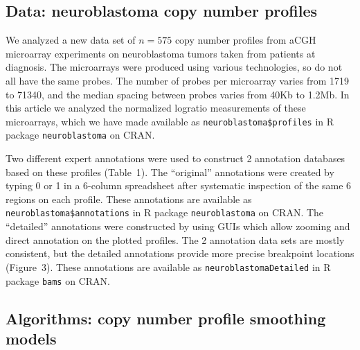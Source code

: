 \documentclass[10pt]{bmc_article}
\newcommand{\code}[1]{\texttt{#1}}
\newcommand{\package}[1]{\texttt{#1}}
\newenvironment{bmcformat}{\begin{raggedright}\baselineskip20pt\sloppy\setboolean{publ}{false}}{\end{raggedright}\baselineskip20pt\sloppy}
\begin{document}
\begin{bmcformat}
\subsection*{Data: neuroblastoma copy number profiles}\label{data}

We analyzed a new data set of $n=575$ copy number profiles from aCGH
microarray experiments on neuroblastoma tumors taken from patients at
diagnosis. The microarrays were produced using various technologies,
so do not all have the same probes. The number of probes per
microarray varies from 1719 to 71340, and the median spacing between
probes varies from 40Kb to 1.2Mb. In this article we analyzed the
normalized logratio measurements of these microarrays, which we have
made available as \code{neuroblastoma\$profiles} in R package
\package{neuroblastoma} on CRAN.

Two different expert annotations were used to construct 2 annotation
databases based on these profiles (Table~1). The ``original''
annotations were created by typing 0 or 1 in a 6-column spreadsheet
after systematic inspection of the same 6 regions on each
profile. These annotations are available as
\code{neuroblastoma\$annotations} in R package \package{neuroblastoma}
on CRAN. The ``detailed'' annotations were constructed by using GUIs
which allow zooming and direct annotation on the plotted profiles. The
2 annotation data sets are mostly consistent, but the detailed
annotations provide more precise breakpoint locations (Figure~3).
These annotations are available as \code{neuroblastomaDetailed} in R
package \package{bams} on CRAN.

\subsection*{Algorithms: copy number profile smoothing
  models}\label{models}


\end{bmcformat}
\end{document}
